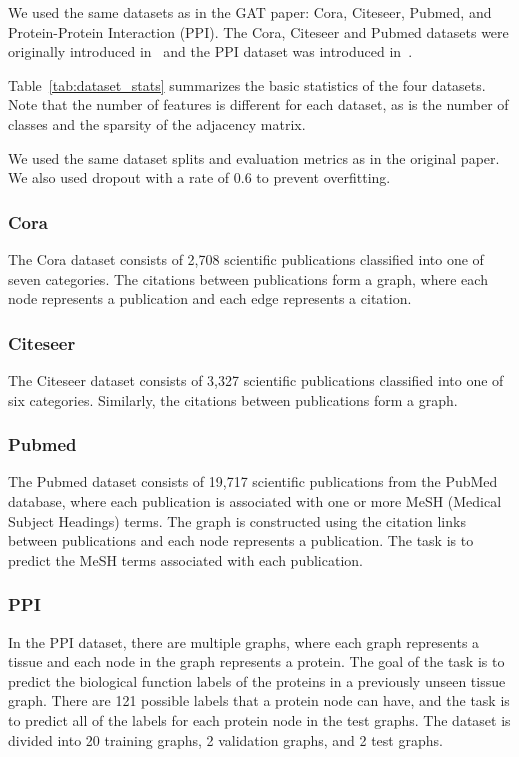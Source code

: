 We used the same datasets as in the GAT paper: Cora, Citeseer, Pubmed, and Protein-Protein Interaction (PPI).
The Cora, Citeseer and Pubmed datasets were originally introduced in~\cite{sen2008collective} and the PPI dataset was
introduced in~\cite{hamilton2017inductive}.

Table~\ref{tab:dataset_stats} summarizes the basic statistics of the four datasets.
Note that the number of features is different for each dataset, as is the number of classes and the sparsity of the adjacency matrix.

We used the same dataset splits and evaluation metrics as in the original paper.
We also used dropout with a rate of 0.6 to prevent overfitting.

\subsubsection{Cora}
The Cora dataset consists of 2,708 scientific publications classified into one of seven categories.
The citations between publications form a graph, where each node represents a publication and each edge represents a citation.

\subsubsection{Citeseer}
The Citeseer dataset consists of 3,327 scientific publications classified into one of six categories.
Similarly, the citations between publications form a graph.

\subsubsection{Pubmed}
The Pubmed dataset consists of 19,717 scientific publications from the PubMed database, where each publication is associated with one or more MeSH (Medical Subject Headings) terms.
The graph is constructed using the citation links between publications and each node represents a publication.
The task is to predict the MeSH terms associated with each publication.

\subsubsection{PPI}
In the PPI dataset, there are multiple graphs, where each graph represents a tissue and each node in the graph represents a protein.
The goal of the task is to predict the biological function labels of the proteins in a previously unseen tissue graph.
There are 121 possible labels that a protein node can have, and the task is to predict all of the labels for each protein node in the test graphs.
The dataset is divided into 20 training graphs, 2 validation graphs, and 2 test graphs.

